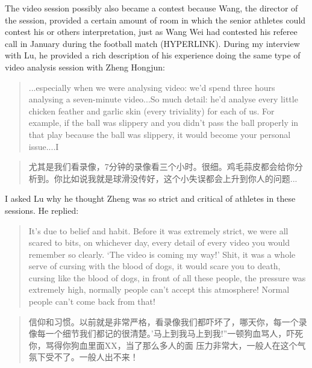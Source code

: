   The video session possibly also became a contest because Wang, the director of the session, provided a certain amount of room in which the senior athletes could contest his or others interpretation, just as Wang Wei had contested his referee call in January during the football match (HYPERLINK). During my interview with Lu, he provided a rich description of his experience doing the same type of video analysis session with Zheng Hongjun:

  \begin{quotation}
    ...especially when we were analysing video: we'd spend three hours analysing a seven-minute video...So much detail: he'd analyse every little chicken feather and garlic skin (every triviality) for each of us. For example, if the ball was slippery and you didn't pass the ball properly in that play because the ball was slippery, it would become your personal issue....I
  \end{quotation}

\begin{quotation}
    尤其是我们看录像，7分钟的录像看三个小时。很细。鸡毛蒜皮都会给你分析到。你比如说我就是球滑没传好，这个小失误都会上升到你人的问题...
\end{quotation}

I asked Lu why he thought Zheng was so strict and critical of athletes in these sessions.  He replied:

\begin{quotation}
    It's due to belief and habit. Before it was extremely strict, we were all scared to bits, on whichever day, every detail of every video you would remember so clearly. `The video is coming my way!'  Shit, it was a whole serve of cursing with the blood of dogs, it would scare you to death, cursing like the blood of dogs, in front of all these people, the pressure was extremely high, normally people can’t accept this atmosphere! Normal people can’t come back from that!
\end{quotation}

\begin{quotation}
    信仰和习惯。以前就是非常严格，看录像我们都吓坏了，哪天你，每一个录像每一个细节我们都记的很清楚。'马上到我马上到我!''一顿狗血骂人，吓死你，骂得你狗血里面XX，当了那么多人的面 压力非常大，一般人在这个气氛下受不了。一般人出不来！
\end{quotation}


